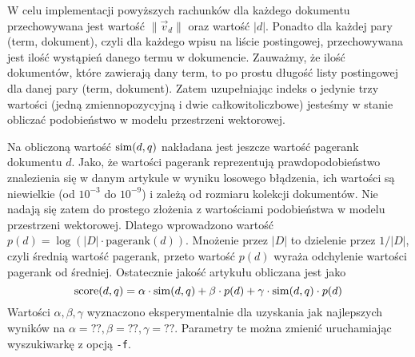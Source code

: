 \documentclass[a4paper,12pt]{article}
\begin{document}
W celu implementacji powyższych rachunków dla każdego dokumentu przechowywana
jest wartość $\|\vec v_d\|$ oraz wartość $|d|$. Ponadto dla każdej pary
(term, dokument), czyli dla każdego wpisu na liście postingowej, przechowywana
jest ilość wystąpień danego termu w dokumencie. Zauważmy, że ilość dokumentów,
które zawierają dany term, to po prostu długość listy postingowej dla danej pary
(term, dokument). Zatem uzupełniając indeks o jedynie trzy wartości (jedną
zmiennopozycyjną i dwie całkowitoliczbowe) jesteśmy w stanie obliczać
podobieństwo w modelu przestrzeni wektorowej.

Na obliczoną wartość $\mathrm{sim}(d,q)$ nakładana jest jeszcze wartość pagerank
dokumentu $d$. Jako, że wartości pagerank reprezentują prawdopodobieństwo
znalezienia się w danym artykule w wyniku losowego błądzenia, ich wartości 
są niewielkie (od $10^{-3}$ do $10^{-9}$) i zależą od rozmiaru kolekcji
dokumentów. Nie nadają się zatem do prostego złożenia z wartościami podobieństwa
w modelu przestrzeni wektorowej. Dlatego wprowadzono wartość $p(d) = \log (|D| \cdot \mathrm{pagerank}(d))$.
Mnożenie przez $|D|$ to dzielenie przez $1/|D|$, czyli średnią wartość pagerank,
przeto wartość $p(d)$ wyraża odchylenie wartości pagerank od średniej.
Ostatecznie jakość artykułu obliczana jest jako
\[ \mathrm{score}(d,q) = \alpha \cdot \mathrm{sim}(d,q) +
                         \beta \cdot p(d) +
                         \gamma \cdot \mathrm{sim}(d,q) \cdot p(d) \]
Wartości $\alpha, \beta, \gamma$ wyznaczono eksperymentalnie dla uzyskania
jak najlepszych wyników na $\alpha = ??, \beta = ??, \gamma = ??$. Parametry
te można zmienić uruchamiając wyszukiwarkę z opcją \texttt{-f}.
\end{document}
